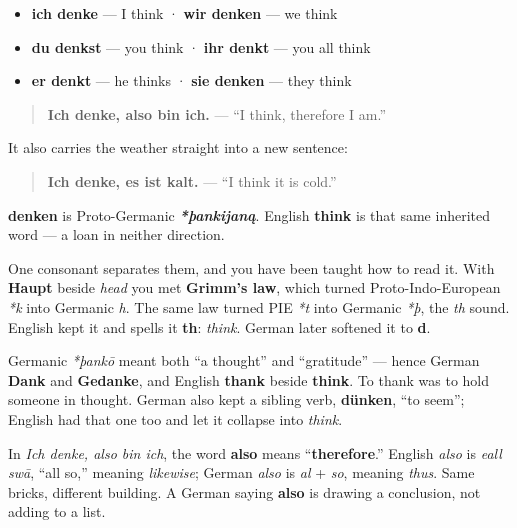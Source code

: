 \begin{itemize}
\raggedright
  \item \textbf{ich denke} — I think · \textbf{wir denken} — we think
  \item \textbf{du denkst} — you think · \textbf{ihr denkt} — you all think
  \item \textbf{er denkt} — he thinks · \textbf{sie denken} — they think
\end{itemize}

\begin{quote}
\textbf{Ich denke, also bin ich.} — \textquotedblleft{}I think, therefore I am.\textquotedblright{}
\end{quote}

It also carries the weather straight into a new sentence:

\begin{quote}
\textbf{Ich denke, es ist kalt.} — \textquotedblleft{}I think it is cold.\textquotedblright{}
\end{quote}

\begin{cousinweb}
\textbf{denken} is Proto-Germanic \emph{\textbf{*þankijaną}}. English \textbf{think} is that same inherited word — a loan in neither direction.

One consonant separates them, and you have been taught how to read it. With \textbf{Haupt} beside \emph{head} you met \textbf{Grimm's law}, which turned Proto-Indo-European \emph{*k} into Germanic \emph{h}. The same law turned PIE \emph{*t} into Germanic \emph{*þ}, the \emph{th} sound. English kept it and spells it \textbf{th}: \emph{think}. German later softened it to \textbf{d}.

Germanic \emph{*þankō} meant both \textquotedblleft{}a thought\textquotedblright{} and \textquotedblleft{}gratitude\textquotedblright{} — hence German \textbf{Dank} and \textbf{Gedanke}, and English \textbf{thank} beside \textbf{think}. To thank was to hold someone in thought. German also kept a sibling verb, \textbf{dünken}, \textquotedblleft{}to seem\textquotedblright{}; English had that one too and let it collapse into \emph{think}.
\end{cousinweb}

\begin{grammarlens}[title={Grammar Lens: also does not mean \textquotedblleft{}also\textquotedblright{}}]
In \emph{Ich denke, also bin ich}, the word \textbf{also} means \textquotedblleft{}\textbf{therefore}.\textquotedblright{} English \emph{also} is \emph{eall swā}, \textquotedblleft{}all so,\textquotedblright{} meaning \emph{likewise}; German \emph{also} is \emph{al} + \emph{so}, meaning \emph{thus}. Same bricks, different building. A German saying \textbf{also} is drawing a conclusion, not adding to a list.
\end{grammarlens}

